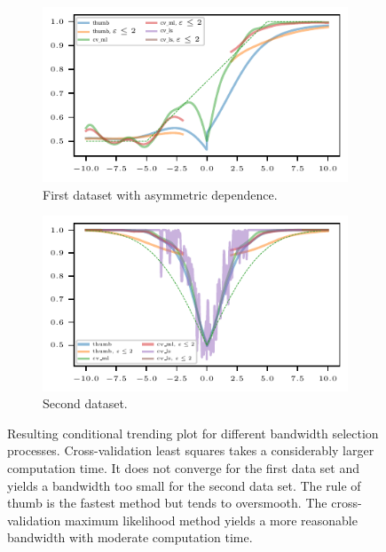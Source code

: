 \begin{figure}
    \centering
    \begin{subfigure}{.48\textwidth}
        \includegraphics{plots/illustrative_examples/cond_prob_plot_bw_asym_butterfly}
        \caption{First dataset with asymmetric dependence.}
    \end{subfigure}
    \begin{subfigure}{.48\textwidth}
        \includegraphics{plots/illustrative_examples/cond_prob_plot_bw_normal}
        \caption{Second dataset. }
    \end{subfigure}
    \caption{Resulting conditional trending plot for different bandwidth selection processes. Cross-validation least squares takes a considerably larger computation time. It does not converge for the first data set and yields a bandwidth too small for the second data set. The rule of thumb is the fastest method but tends to oversmooth. The cross-validation maximum likelihood method yields a more reasonable bandwidth with moderate computation time. }\label{fig:trending-cond-prob-bw}
\end{figure}

